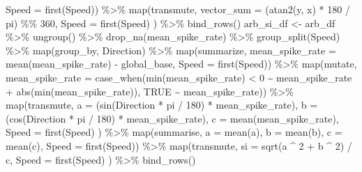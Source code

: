 \documentclass[
]{book}
\newenvironment{Shaded}{\begin{snugshade}}{\end{snugshade}}
\newcommand{\AttributeTok}[1]{\textcolor[rgb]{0.77,0.63,0.00}{#1}}
\newcommand{\ConstantTok}[1]{\textcolor[rgb]{0.00,0.00,0.00}{#1}}
\newcommand{\DecValTok}[1]{\textcolor[rgb]{0.00,0.00,0.81}{#1}}
\newcommand{\FunctionTok}[1]{\textcolor[rgb]{0.00,0.00,0.00}{#1}}
\newcommand{\NormalTok}[1]{#1}
\newcommand{\OtherTok}[1]{\textcolor[rgb]{0.56,0.35,0.01}{#1}}
\newcommand{\SpecialCharTok}[1]{\textcolor[rgb]{0.00,0.00,0.00}{#1}}
\begin{document}
\begin{Shaded}
\begin{Highlighting}[]
      \AttributeTok{Speed =} \FunctionTok{first}\NormalTok{(Speed)) }\SpecialCharTok{\%\textgreater{}\%}
  \FunctionTok{map}\NormalTok{(transmute,}
      \AttributeTok{vector\_sum =}\NormalTok{ (}\FunctionTok{atan2}\NormalTok{(y, x) }\SpecialCharTok{*} \DecValTok{180} \SpecialCharTok{/}\NormalTok{ pi) }\SpecialCharTok{\%\%} \DecValTok{360}\NormalTok{,}
      \AttributeTok{Speed =} \FunctionTok{first}\NormalTok{(Speed)}
\NormalTok{  ) }\SpecialCharTok{\%\textgreater{}\%}
  \FunctionTok{bind\_rows}\NormalTok{()}
\NormalTok{arb\_si\_df }\OtherTok{\textless{}{-}}
\NormalTok{  arb\_df }\SpecialCharTok{\%\textgreater{}\%}
  \FunctionTok{ungroup}\NormalTok{() }\SpecialCharTok{\%\textgreater{}\%}
  \FunctionTok{drop\_na}\NormalTok{(mean\_spike\_rate) }\SpecialCharTok{\%\textgreater{}\%}
  \FunctionTok{group\_split}\NormalTok{(Speed) }\SpecialCharTok{\%\textgreater{}\%}
  \FunctionTok{map}\NormalTok{(group\_by, Direction) }\SpecialCharTok{\%\textgreater{}\%}
  \FunctionTok{map}\NormalTok{(summarize,}
      \AttributeTok{mean\_spike\_rate =} \FunctionTok{mean}\NormalTok{(mean\_spike\_rate) }\SpecialCharTok{{-}}\NormalTok{ global\_base,}
      \AttributeTok{Speed =} \FunctionTok{first}\NormalTok{(Speed)) }\SpecialCharTok{\%\textgreater{}\%}
  \FunctionTok{map}\NormalTok{(mutate,}
      \AttributeTok{mean\_spike\_rate =}
        \FunctionTok{case\_when}\NormalTok{(}\FunctionTok{min}\NormalTok{(mean\_spike\_rate) }\SpecialCharTok{\textless{}} \DecValTok{0} \SpecialCharTok{\textasciitilde{}}\NormalTok{ mean\_spike\_rate }\SpecialCharTok{+} \FunctionTok{abs}\NormalTok{(}\FunctionTok{min}\NormalTok{(mean\_spike\_rate)),}
                  \ConstantTok{TRUE} \SpecialCharTok{\textasciitilde{}}\NormalTok{ mean\_spike\_rate)) }\SpecialCharTok{\%\textgreater{}\%}
  \FunctionTok{map}\NormalTok{(transmute,}
      \AttributeTok{a =}\NormalTok{ (}\FunctionTok{sin}\NormalTok{(Direction }\SpecialCharTok{*}\NormalTok{ pi }\SpecialCharTok{/} \DecValTok{180}\NormalTok{) }\SpecialCharTok{*}\NormalTok{ mean\_spike\_rate),}
      \AttributeTok{b =}\NormalTok{ (}\FunctionTok{cos}\NormalTok{(Direction }\SpecialCharTok{*}\NormalTok{ pi }\SpecialCharTok{/} \DecValTok{180}\NormalTok{) }\SpecialCharTok{*}\NormalTok{ mean\_spike\_rate),}
      \AttributeTok{c =} \FunctionTok{mean}\NormalTok{(mean\_spike\_rate),}
      \AttributeTok{Speed =} \FunctionTok{first}\NormalTok{(Speed)}
\NormalTok{  ) }\SpecialCharTok{\%\textgreater{}\%}
  \FunctionTok{map}\NormalTok{(summarise,}
      \AttributeTok{a =} \FunctionTok{mean}\NormalTok{(a),}
      \AttributeTok{b =} \FunctionTok{mean}\NormalTok{(b),}
      \AttributeTok{c =} \FunctionTok{mean}\NormalTok{(c),}
      \AttributeTok{Speed =} \FunctionTok{first}\NormalTok{(Speed)) }\SpecialCharTok{\%\textgreater{}\%}
  \FunctionTok{map}\NormalTok{(transmute,}
      \AttributeTok{si =} \FunctionTok{sqrt}\NormalTok{(a }\SpecialCharTok{\^{}} \DecValTok{2} \SpecialCharTok{+}\NormalTok{ b }\SpecialCharTok{\^{}} \DecValTok{2}\NormalTok{) }\SpecialCharTok{/}\NormalTok{ c,}
      \AttributeTok{Speed =} \FunctionTok{first}\NormalTok{(Speed)}
\NormalTok{  ) }\SpecialCharTok{\%\textgreater{}\%}
  \FunctionTok{bind\_rows}\NormalTok{()}


\end{Highlighting}
\end{Shaded}
\end{document}
